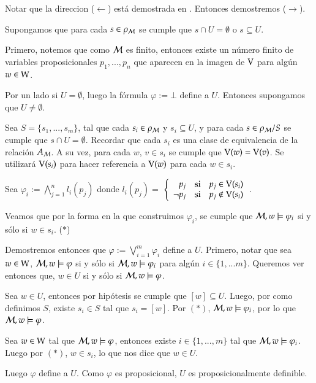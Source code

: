 \begin{demostracion}
    Notar que la direccion ($\leftarrow$) está demostrada en . Entonces demostremos ($\rightarrow$).

    Supongamos que para cada $s \in \rho_{\mathcal{M}}$ se cumple que $s \cap U = \emptyset$ o $s \subseteq U$.

    Primero, notemos que como $\mathcal{M}$ es finito, entonces existe un número finito de variables proposicionales $p_1,...,p_n$ que aparecen en la imagen de $\mathrm{V}$ para algún $w \in \mathrm{W}$.

    Por un lado si $U = \emptyset$, luego la fórmula $ \varphi := \bot$ define a $U$. Entonces supongamos que $U \neq \emptyset$. 
    
    Sea $S = \{s_1,...,s_m\}$, tal que cada $s_i \in \rho_{\mathcal{M}}$ y $s_i \subseteq U$, y para cada $s \in \rho_{\mathcal{M}}/S$ se cumple que $s \cap U = \emptyset$. 
    Recordar que cada $s_i$ es una clase de equivalencia de la relación $A_{\mathcal{M}}$. A su vez, para cada $w$, $v \in s_i$ se cumple que 
    $\mathrm{V}(w) = \mathrm{V}(v)$. Se utilizará $\mathrm{V}(s_i)$ para hacer referencia a $\mathrm{V}(w)$ para cada $w \in s_i$.

    Sea $\varphi_i := \bigwedge\limits_{j = 1}^{n} l_i(p_j)$ donde $l_i(p_j) = $
    $\left\{ \begin{array}{rcl}
            p_j & \mbox{si}
            & p_j \in \mathrm{V}(s_i) \\ \neg p_j & \mbox{si} & p_j \notin \mathrm{V}(s_i) \\
            \end{array}\right. 
    $.

    Veamos que por la forma en la que construimos $\varphi_i$, se cumple que $\mathcal{M}, w \models \varphi_i$ si y sólo si $w \in s_i$. ($*$)
    
    Demostremos entonces que $\varphi := \bigvee\limits_{i = 1}^{m}\varphi_i$ define a $U$. Primero, notar que sea $w \in \mathrm{W}$, 
    $\mathcal{M}, w \models \varphi$ si y sólo si $\mathcal{M}, w \models \varphi_i$ para algún $i \in \{1,...m\}$.  
    Queremos ver entonces que, $w \in U$ si y sólo si $\mathcal{M}, w \models \varphi$. 

    Sea $w \in U$, entonces por hipótesis se cumple que $[w] \subseteq U$. Luego, por como definimos $S$, existe $s_i \in S$ tal que 
    $s_i = [w]$. Por $(*)$, $\mathcal{M}, w \models \varphi_i$, por lo que $\mathcal{M}, w \models \varphi$.

    Sea $w \in \mathrm{W}$ tal que $\mathcal{M}, w \models \varphi$, entonces existe $i \in \{1,...,m\}$ tal que $\mathcal{M}, w \models \varphi_i$. 
    Luego por $(*)$, $w \in s_i$, lo que nos dice que $w \in U$.

    Luego $\varphi$ define a $U$. Como $\varphi$ es proposicional, $U$ es proposicionalmente definible.
\end{demostracion}

